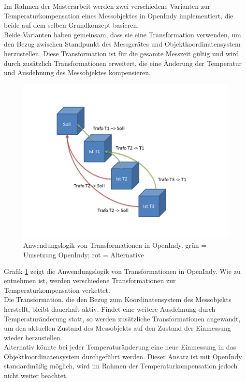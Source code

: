 Im Rahmen der Masterarbeit werden zwei verschiedene Varianten zur Temperaturkompensation eines Messobjektes in OpenIndy implementiert, die beide auf dem selben Grundkonzept basieren.\\
Beide Varianten haben gemeinsam, dass sie eine Transformation verwenden, um den Bezug zwischen Standpunkt des Messgerätes und Objektkoordinatensystem herzustellen. Diese Transformation ist für die gesamte Messzeit gültig und wird durch zusätzlich Transformationen erweitert, die eine Änderung der Temperatur und Ausdehnung des Messobjektes kompensieren.
\begin{figure}[H]
\vspace{-0.5cm}
	\label{fig:trafoverkettung}
	\centering
		\includegraphics[scale=0.5]{bilder/transformationsverkettung}
	\caption[Anwendungslogik von Transformationen in OpenIndy]{Anwendungslogik von Transformationen in OpenIndy. grün = Umsetzung OpenIndy; rot = Alternative}
\end{figure}
Grafik \ref{fig:trafoverkettung} zeigt die Anwendungslogik von Transformationen in OpenIndy. Wie zu entnehmen ist, werden verschiedene Transformationen zur Temperaturkompensation verkettet. \\
Die Transformation, die den Bezug zum Koordinatensystem des Messobjekts herstellt, bleibt dauerhaft aktiv. Findet eine weitere Ausdehnung durch Temperaturänderung statt, so werden zusätzliche Transformationen angewandt, um den aktuellen Zustand des Messobjekts auf den Zustand der Einmessung wieder herzustellen.\\
Alternativ könnte bei jeder Temperaturänderung eine neue Einmessung in das Objektkoordinatensystem durchgeführt werden. Dieser Ansatz ist mit OpenIndy standardmäßig möglich, wird im Rahmen der Temperaturkompensation jedoch nicht weiter beachtet.\\
